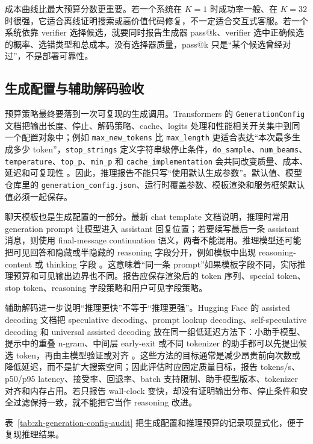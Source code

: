 \documentclass[UTF8,zihao=-4,openany]{ctexbook}
\begin{document}
成本曲线比最大预算分数更重要。若一个系统在 $K=1$ 时成功率一般、在 $K=32$ 时很强，它适合离线证明搜索或高价值代码修复，不一定适合交互式客服。若一个系统依靠 verifier 选择候选，就要同时报告生成器 pass@k、verifier 选中正确候选的概率、选错类型和总成本。没有选择器质量，pass@k 只是“某个候选曾经对过”，不是部署可靠性。

\subsection{生成配置与辅助解码验收}
预算策略最终要落到一次可复现的生成调用。Transformers 的 \texttt{GenerationConfig} 文档把输出长度、停止、解码策略、cache、logits 处理和性能相关开关集中到同一个配置对象中；例如 \texttt{max\_new\_tokens} 比 \texttt{max\_length} 更适合表达“本次最多生成多少 token”，\texttt{stop\_strings} 定义字符串级停止条件，\texttt{do\_sample}、\texttt{num\_beams}、\texttt{temperature}、\texttt{top\_p}、\texttt{min\_p} 和 \texttt{cache\_implementation} 会共同改变质量、成本、延迟和可复现性 \cite{huggingface2026transformersgeneration}。因此，推理报告不能只写“使用默认生成参数”。默认值、模型仓库里的 \texttt{generation\_config.json}、运行时覆盖参数、模板渲染和服务框架默认值必须一起保存。

聊天模板也是生成配置的一部分。最新 chat template 文档说明，推理时常用 generation prompt 让模型进入 assistant 回复位置；若要续写最后一条 assistant 消息，则使用 final-message continuation 语义，两者不能混用。推理模型还可能把可见回答和隐藏或半隐藏的 reasoning 字段分开，例如模板中出现 reasoning-content 或 thinking 字段 \cite{huggingface2026chattemplates}。这意味着“同一条 prompt”如果模板字段不同，实际推理预算和可见输出边界也不同。报告应保存渲染后的 token 序列、special token、stop token、reasoning 字段策略和用户可见字段策略。

辅助解码进一步说明“推理更快”不等于“推理更强”。Hugging Face 的 assisted decoding 文档把 speculative decoding、prompt lookup decoding、self-speculative decoding 和 universal assisted decoding 放在同一组低延迟方法下：小助手模型、提示中的重叠 n-gram、中间层 early-exit 或不同 tokenizer 的助手都可以先提出候选 token，再由主模型验证或对齐 \cite{huggingface2026transformersassisteddecoding}。这些方法的目标通常是减少昂贵前向次数或降低延迟，而不是扩大搜索空间；因此评估时应固定质量目标，报告 tokens/s、p50/p95 latency、接受率、回退率、batch 支持限制、助手模型版本、tokenizer 对齐和内存占用。若只报告 wall-clock 变快，却没有证明输出分布、停止条件和安全过滤保持一致，就不能把它当作 reasoning 改进。

表~\ref{tab:zh-generation-config-audit} 把生成配置和推理预算的记录项显式化，便于复现推理结果。
\end{document}
